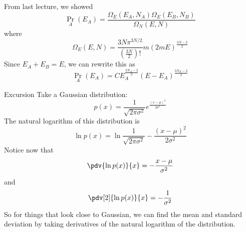 \documentclass[a4paper,twoside,master.tex]{subfiles}
\begin{document}

From last lecture, we showed
\begin{equation}
    \Pr_{A}(E_A) = \frac{\Omega_E (E_A, N_A) \Omega_E(E_B, N_B)}{\Omega_N(E,N)}
\end{equation}
where
\begin{equation}
    \Omega_E(E,N) = \frac{3N \pi^{3N/2}}{\left( \frac{3N}{2} \right)!} m(2mE)^{\frac{3N-2}{2}}
\end{equation}
Since $ E_A + E_B = E $, we can rewrite this as
\begin{equation}
    \Pr_{A}(E_A) = CE_A^{\frac{3N_A - 2}{2}} (E - E_A)^{\frac{3N_B-2}{2}}
\end{equation}

\begin{note}{Excursion}
    Take a Gaussian distribution:
    \begin{equation}
        p(x) = \frac{1}{\sqrt{2 \pi \sigma^2}} e^{\frac{(x- \mu)^2}{2 \sigma^2}}
    \end{equation}
    The natural logarithm of this distribution is
    \begin{equation}
        \ln{p(x)} = \ln{\frac{1}{\sqrt{2 \pi \sigma^2}}} - \frac{(x - \mu)^2}{2 \sigma^2}
    \end{equation}
    Notice now that
    \begin{equation}
        \pdv{\ln{p(x)}}{x} = - \frac{x - \mu}{\sigma^2}
    \end{equation}
    and
    \begin{equation}
        \pdv[2]{\ln{p(x)}}{x} = - \frac{1}{\sigma^2}
    \end{equation}
    So for things that look close to Gaussian, we can find the mean and standard deviation by taking derivatives of the natural logarithm of the distribution.
\end{note}
\end{document}
